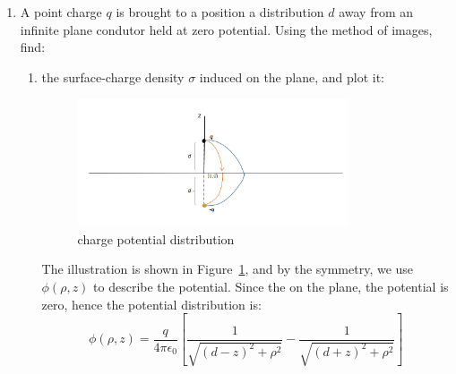 \documentclass[a4paper,11pt]{article}
\begin{document}
\begin{enumerate}
  \item A point charge $q$ is brought to a position a distribution $d$ away from an infinite plane condutor held at zero potential. Using the method of images, find:
  \begin{enumerate}
    \item the surface-charge density $\sigma$ induced on the plane, and plot it:
    \begin{figure}[h]
      \centering
      \includegraphics[width=0.8\textwidth]{fig2.png}\caption{charge potential distribution}
      \label{fig2}
    \end{figure}

    The illustration is shown in Figure~\ref{fig2}, and by the symmetry, we use $\phi(\rho,z)$ to describe the potential. Since the on the plane, the potential is zero, hence the potential distribution is:
    \begin{equation}
      \phi(\rho,z)=\dfrac{q}{4\pi\epsilon_0}\left[\dfrac{1}{\sqrt{{(d-z)}^2+\rho^2}}-\dfrac{1}{\sqrt{{(d+z)}^2+\rho^2}}\right]
    \end{equation}


\end{enumerate}
\end{enumerate}
\end{document}
